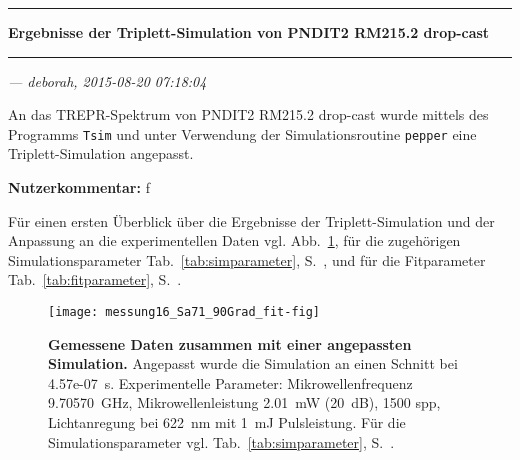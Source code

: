 \documentclass{article}
\begin{document}
\thispagestyle{empty}

\vspace*{-1.5cm}

\noindent\rule[1.5ex]{\textwidth}{1pt}

\begin{sffamily}\bfseries\large
Ergebnisse der Triplett-Simulation von PNDIT2 RM215.2 drop-cast
\end{sffamily}

\noindent\rule{\textwidth}{1pt}

\begin{flushright}\slshape
--- deborah, 2015-08-20 07:18:04
\end{flushright}

\vspace*{1.5em}

An das TREPR-Spektrum von PNDIT2 RM215.2 drop-cast wurde mittels des Programms \texttt{Tsim} und unter Verwendung der Simulationsroutine \texttt{pepper} eine Triplett-Simulation angepasst.


\textbf{Nutzerkommentar:} f


Für einen ersten Überblick über die Ergebnisse der Triplett-Simulation und der Anpassung an die experimentellen Daten vgl. Abb.~\ref{fig:ergebnisse}, für die zugehörigen Simulationsparameter Tab.~\ref{tab:simparameter}, S.~\pageref{tab:simparameter}, und für die Fitparameter Tab.~\ref{tab:fitparameter}, S.~\pageref{tab:fitparameter}.


\begin{figure}[h]
\centering

\texttt{[image: messung16\_Sa71\_90Grad\_fit-fig]}

\caption{\textbf{Gemessene Daten zusammen mit einer angepassten Simulation.} Angepasst wurde die Simulation an einen Schnitt bei 4.57e-07~s. Experimentelle Parameter: Mikrowellenfrequenz  9.70570~GHz, Mikrowellenleistung  2.01~mW (20~dB), 1500 spp, Lichtanregung bei 622~nm mit   1~mJ Pulsleistung. Für die Simulationsparameter vgl. Tab.~\ref{tab:simparameter}, S.~\pageref{tab:simparameter}.}
\label{fig:ergebnisse}
\end{figure}

\begin{center}
\setlength{\fboxsep}{1.5ex}\setlength{\fboxrule}{.75pt}
\end{center}
\end{document}

